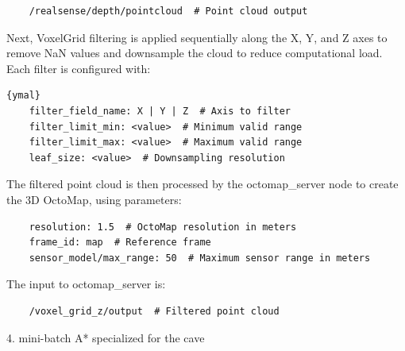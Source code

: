 \documentclass{article}
\begin{document}
\begin{lstlisting}
    /realsense/depth/pointcloud  # Point cloud output  
\end{lstlisting}

Next, VoxelGrid filtering is applied sequentially along the X, Y, and Z axes to remove NaN values and downsample the cloud to reduce computational load. Each filter is configured with:

\begin{lstlisting}{ymal}
    filter_field_name: X | Y | Z  # Axis to filter
    filter_limit_min: <value>  # Minimum valid range
    filter_limit_max: <value>  # Maximum valid range
    leaf_size: <value>  # Downsampling resolution
\end{lstlisting}

The filtered point cloud is then processed by the octomap\_server node to create the 3D OctoMap, using parameters:
\begin{lstlisting}
    resolution: 1.5  # OctoMap resolution in meters
    frame_id: map  # Reference frame
    sensor_model/max_range: 50  # Maximum sensor range in meters
    \end{lstlisting}

The input to octomap\_server is:
\begin{lstlisting}
    /voxel_grid_z/output  # Filtered point cloud
\end{lstlisting}

4. mini-batch A* specialized for the cave
\end{document}
